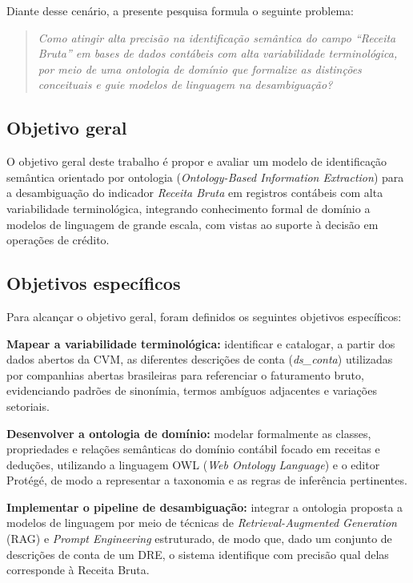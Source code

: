 \documentclass[12pt,a4paper]{article}
\begin{document}
Diante desse cenário, a presente pesquisa formula o seguinte problema:

\begin{quote}
\textit{Como atingir alta precisão na identificação semântica do campo ``Receita Bruta'' em bases de dados contábeis com alta variabilidade terminológica, por meio de uma ontologia de domínio que formalize as distinções conceituais e guie modelos de linguagem na desambiguação?}
\end{quote}

\subsection{Objetivo geral}

O objetivo geral deste trabalho é propor e avaliar um modelo de identificação semântica orientado por ontologia (\textit{Ontology-Based Information Extraction}) para a desambiguação do indicador \textit{Receita Bruta} em registros contábeis com alta variabilidade terminológica, integrando conhecimento formal de domínio a modelos de linguagem de grande escala, com vistas ao suporte à decisão em operações de crédito.

\subsection{Objetivos específicos}

Para alcançar o objetivo geral, foram definidos os seguintes objetivos específicos:

\textbf{Mapear a variabilidade terminológica:} identificar e catalogar, a partir dos dados abertos da CVM, as diferentes descrições de conta (\textit{ds\_conta}) utilizadas por companhias abertas brasileiras para referenciar o faturamento bruto, evidenciando padrões de sinonímia, termos ambíguos adjacentes e variações setoriais.

\textbf{Desenvolver a ontologia de domínio:} modelar formalmente as classes, propriedades e relações semânticas do domínio contábil focado em receitas e deduções, utilizando a linguagem OWL (\textit{Web Ontology Language}) e o editor Prot\'eg\'e, de modo a representar a taxonomia e as regras de inferência pertinentes.

\textbf{Implementar o pipeline de desambiguação:} integrar a ontologia proposta a modelos de linguagem por meio de técnicas de \textit{Retrieval-Augmented Generation} (RAG) e \textit{Prompt Engineering} estruturado, de modo que, dado um conjunto de descrições de conta de um DRE, o sistema identifique com precisão qual delas corresponde à Receita Bruta.
\end{document}
